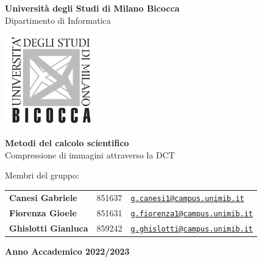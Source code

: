 \begin{center}
	{\LARGE \textbf{Università degli Studi di Milano Bicocca}} \\
	\vspace{0.2cm}
	{\Large {Dipartimento di Informatica}} \\ 
	\vspace{1cm}
	
	\includegraphics[width=4cm]{figures/unimib-logo.png} \\
	\vspace{0.4cm}
	
	{\huge \textbf{Metodi del calcolo scientifico}} \\ 
	\Large{Compressione di immagini attraverso la DCT}
	\vspace{3cm}
\end{center}
\vspace{2cm}

\noindent \large{Membri del gruppo:} 

\begin{tabular}{@{}lll}
	\textbf{Canesi Gabriele} & 851637 & \href{mailto:g.canesi1@campus.unimib.it}{\texttt{g.canesi1@campus.unimib.it}}\\
	\textbf{Fiorenza Gioele} & 851631 & \href{mailto:g.fiorenza1@campus.unimib.it}{\texttt{g.fiorenza1@campus.unimib.it}}\\
	\textbf{Ghislotti Gianluca} & 859242 & \href{mailto:g.ghislotti@campus.unimib.it}{\texttt{g.ghislotti@campus.unimib.it}}\\
\end{tabular}

\vfill
\begin{center}
	\large{\textbf{Anno Accademico 2022/2023}}
\end{center}



